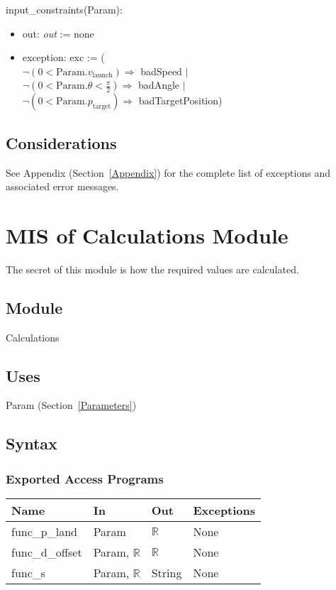 \documentclass[12pt, titlepage]{article}
\begin{document}
input\_constraints(Param):
 \begin{itemize}
 \item out: \textit{out} := none
 \item exception: exc := ( \\
 $\neg (0 < \text{Param}.v_{\text{launch}}) \Rightarrow$ badSpeed $|$\\
 $\neg (0 < \text{Param}.\theta < \frac{\pi}{2}) \Rightarrow$ badAngle $|$\\
 $\neg (0 < \text{Param}.p_{\text{target}}) \Rightarrow$ badTargetPosition)
 \end{itemize}

\subsection{Considerations}

See Appendix (Section~\ref{Appendix}) for the complete list of exceptions and
 associated error messages.
 
\newpage

\section{MIS of Calculations Module} \label{Calc}

The secret of this module is how the required values are calculated.

\subsection{Module}

Calculations

\subsection{Uses}

Param (Section~\ref{Parameters})

\subsection{Syntax}

\subsubsection{Exported Access Programs}

\begin{center}
 \begin{tabular}{p{3cm} p{3cm} p{1cm} p{8cm}}
 \hline
 \textbf{Name} & \textbf{In} & \textbf{Out} & \textbf{Exceptions} \\
 \hline
 func\_p\_land & Param & $\mathbb{R}$ & None \\
 \hline
 func\_d\_offset & Param, $\mathbb{R}$ & $\mathbb{R}$ & None \\
 \hline
 func\_s & Param, $\mathbb{R}$ & String & None \\
 \hline
 \end{tabular}
 \end{center}
\end{document}
